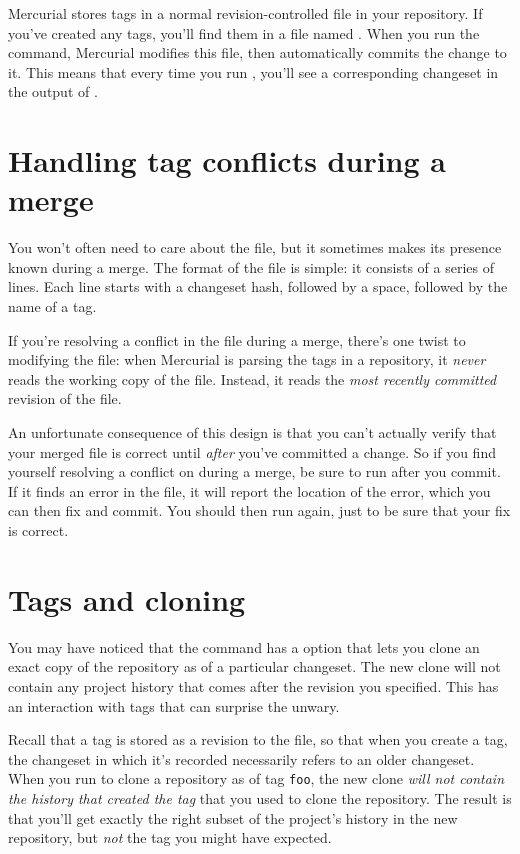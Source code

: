 Mercurial stores tags in a normal revision-controlled file in your
repository.  If you've created any tags, you'll find them in a file
named .  When you run the  command,
Mercurial modifies this file, then automatically commits the change to
it.  This means that every time you run , you'll see a
corresponding changeset in the output of .

\section{Handling tag conflicts during a merge}

You won't often need to care about the  file, but
it sometimes makes its presence known during a merge.  The format of
the file is simple: it consists of a series of lines.  Each line
starts with a changeset hash, followed by a space, followed by the
name of a tag.

If you're resolving a conflict in the  file during
a merge, there's one twist to modifying the  file:
when Mercurial is parsing the tags in a repository, it \emph{never}
reads the working copy of the  file.  Instead, it
reads the \emph{most recently committed} revision of the file.

An unfortunate consequence of this design is that you can't actually
verify that your merged  file is correct until
\emph{after} you've committed a change.  So if you find yourself
resolving a conflict on  during a merge, be sure to
run  after you commit.  If it finds an error in the
 file, it will report the location of the error,
which you can then fix and commit.  You should then run 
again, just to be sure that your fix is correct.

\section{Tags and cloning}

You may have noticed that the  command has a
 option that lets you clone an exact copy of the
repository as of a particular changeset.  The new clone will not
contain any project history that comes after the revision you
specified.  This has an interaction with tags that can surprise the
unwary.

Recall that a tag is stored as a revision to the 
file, so that when you create a tag, the changeset in which it's
recorded necessarily refers to an older changeset.  When you run
 to clone a repository as of tag
\texttt{foo}, the new clone \emph{will not contain the history that
  created the tag} that you used to clone the repository.  The result
is that you'll get exactly the right subset of the project's history
in the new repository, but \emph{not} the tag you might have expected.

